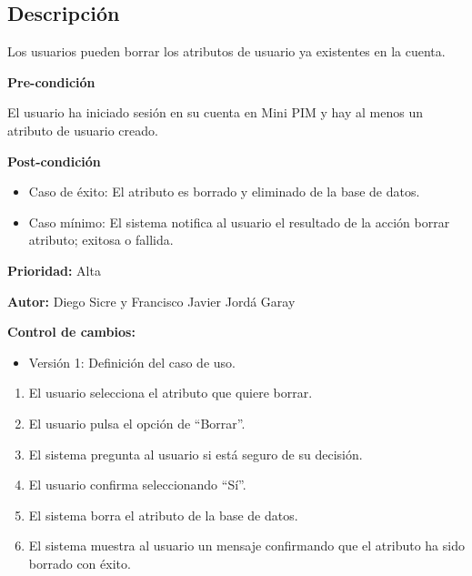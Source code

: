 
\subsection*{Descripción}
Los usuarios pueden borrar los atributos de usuario ya existentes en la cuenta.
\vspace{0.15cm}

\textbf{Pre-condición}\par
El usuario ha iniciado sesión en su cuenta en Mini PIM y hay al menos un atributo de usuario creado.\par
\vspace{0.15cm}

\textbf{Post-condición}
\begin{itemize}
    \item Caso de éxito: El atributo es borrado y eliminado de la base de datos.
    \item Caso mínimo: El sistema notifica al usuario el resultado de la acción borrar atributo; exitosa o fallida.
\end{itemize}

\textbf{Prioridad: }
Alta
\vspace{0.15cm}

\textbf{Autor: }
Diego Sicre y Francisco Javier Jordá Garay\par
\vspace{0.15cm}

\textbf{Control de cambios: }
\begin{itemize}
    \item Versión 1: Definición del caso de uso.
\end{itemize}


\begin{enumerate}
    \item El usuario selecciona el atributo que quiere borrar.
    \item El usuario pulsa el opción de \enquote{Borrar}.
    \item El sistema pregunta al usuario si está seguro de su decisión.
    \item El usuario confirma seleccionando \enquote{Sí}.
    \item El sistema borra el atributo de la base de datos.
    \item El sistema muestra al usuario un mensaje confirmando que el atributo ha sido borrado con éxito.
\end{enumerate}

